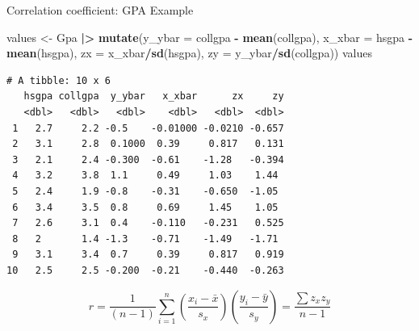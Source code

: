 \documentclass[
  ignorenonframetext,
]{beamer}
\newenvironment{Shaded}{\begin{snugshade}}{\end{snugshade}}
\newcommand{\AttributeTok}[1]{\textcolor[rgb]{0.13,0.29,0.53}{#1}}
\newcommand{\FunctionTok}[1]{\textcolor[rgb]{0.13,0.29,0.53}{\textbf{#1}}}
\newcommand{\NormalTok}[1]{#1}
\newcommand{\OtherTok}[1]{\textcolor[rgb]{0.56,0.35,0.01}{#1}}
\newcommand{\SpecialCharTok}[1]{\textcolor[rgb]{0.81,0.36,0.00}{\textbf{#1}}}
\begin{document}
\begin{frame}[fragile]{Correlation coefficient: GPA Example}
\protect{}\label{correlation-coefficient-gpa-example-2}
\small

\begin{Shaded}
\begin{Highlighting}[]
\NormalTok{values }\OtherTok{\textless{}{-}}\NormalTok{ Gpa }\SpecialCharTok{|\textgreater{}} 
  \FunctionTok{mutate}\NormalTok{(}\AttributeTok{y\_ybar =}\NormalTok{ collgpa }\SpecialCharTok{{-}} \FunctionTok{mean}\NormalTok{(collgpa), }
         \AttributeTok{x\_xbar =}\NormalTok{ hsgpa }\SpecialCharTok{{-}} \FunctionTok{mean}\NormalTok{(hsgpa),}
         \AttributeTok{zx =}\NormalTok{ x\_xbar}\SpecialCharTok{/}\FunctionTok{sd}\NormalTok{(hsgpa), }\AttributeTok{zy =}\NormalTok{ y\_ybar}\SpecialCharTok{/}\FunctionTok{sd}\NormalTok{(collgpa))}
\NormalTok{values}
\end{Highlighting}
\end{Shaded}

\begin{verbatim}
# A tibble: 10 x 6
   hsgpa collgpa  y_ybar   x_xbar      zx     zy
   <dbl>   <dbl>   <dbl>    <dbl>   <dbl>  <dbl>
 1   2.7     2.2 -0.5    -0.01000 -0.0210 -0.657
 2   3.1     2.8  0.1000  0.39     0.817   0.131
 3   2.1     2.4 -0.300  -0.61    -1.28   -0.394
 4   3.2     3.8  1.1     0.49     1.03    1.44 
 5   2.4     1.9 -0.8    -0.31    -0.650  -1.05 
 6   3.4     3.5  0.8     0.69     1.45    1.05 
 7   2.6     3.1  0.4    -0.110   -0.231   0.525
 8   2       1.4 -1.3    -0.71    -1.49   -1.71 
 9   3.1     3.4  0.7     0.39     0.817   0.919
10   2.5     2.5 -0.200  -0.21    -0.440  -0.263
\end{verbatim}

\normalsize

\[r=\frac{1}{(n-1)}\sum_{i=1}^n \left(\frac{x_i-\bar{x}}{s_x}\right)\left(\frac{y_i-\bar{y}}{s_y}\right)=\frac{\sum z_x z_y}{n-1}\]
\end{frame}
\end{document}
